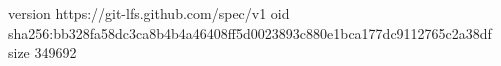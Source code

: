 version https://git-lfs.github.com/spec/v1
oid sha256:bb328fa58dc3ca8b4b4a46408ff5d0023893c880e1bca177dc9112765c2a38df
size 349692
